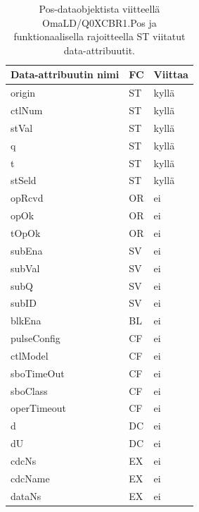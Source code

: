 \begin{table}[ht!]
	\caption{Pos-dataobjektista viitteellä OmaLD/Q0XCBR1.Pos ja funktionaalisella rajoitteella ST viitatut data-attribuutit.}
	\label{tab:fc-usage-example}
	\begin{tabular}{l | l | l }
		\hline
		\textbf{Data-attribuutin nimi} & \textbf{FC} & \textbf{Viittaa} \\
		\hline \hline
		origin & ST & kyllä \\
		ctlNum & ST & kyllä \\
		stVal & ST & kyllä \\
		q & ST & kyllä \\
		t & ST & kyllä \\
		stSeld & ST & kyllä \\
		opRcvd & OR & ei \\
		opOk & OR & ei \\
		tOpOk & OR & ei \\
		subEna & SV & ei \\
		subVal & SV & ei \\
		subQ & SV & ei \\
		subID & SV & ei \\
		blkEna & BL & ei \\
		pulseConfig & CF & ei \\
		ctlModel & CF & ei \\
		sboTimeOut & CF & ei \\
		sboClass & CF & ei \\
		operTimeout & CF & ei \\
		d & DC & ei \\
		dU & DC & ei \\
		cdcNs & EX & ei \\
		cdcName & EX & ei \\
		dataNs & EX & ei \\
		\hline
	\end{tabular}
\end{table}

